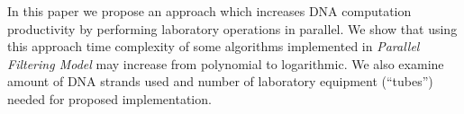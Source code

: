 In this paper we propose an approach which increases DNA computation productivity by performing laboratory operations in parallel. We show that using this approach time complexity of some algorithms implemented in \emph{Parallel Filtering Model} \cite{Amos:1996} may increase from polynomial to logarithmic. We also examine amount of DNA strands used and number of laboratory equipment (``tubes'') needed for proposed implementation.